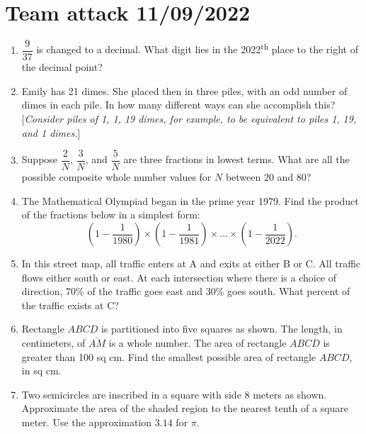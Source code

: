 \documentclass[11pt]{article}
\begin{document}
  \pagestyle{empty}
  \section*{Team attack 11/09/2022}
  \begin{enumerate}[leftmargin=3mm]
    \item $\dfrac{9}{37}$ is changed to a decimal. What digit lies in the 2022\textsuperscript{th} place to the right of the decimal point? %
    \item Emily has 21 dimes. She placed then in three piles, with an odd number of dimes in each pile. In how many different ways can she accomplish this? [\emph{Consider piles of 1, 1, 19 dimes, for example, to be equivalent to piles 1, 19, and 1 dimes.}] %
    \item Suppose $\dfrac{2}{N}$, $\dfrac{3}{N}$, and $\dfrac{5}{N}$ are three fractions in lowest terms. What are all the possible composite whole number values for $N$ between $20$ and $80$? %
    \item The Mathematical Olympiad began in the prime year 1979. Find the product of the fractions below in a simplest form:
    \[ 
      \left(1 - \frac{1}{1980}\right) \times \left(1 - \frac{1}{1981}\right) \times \ldots \times \left(1 - \frac{1}{2022}\right). 
    \] %
    \item In this street map, all traffic enters at A and exits at either B or C. All traffic flows either south or east. At each intersection where there is a choice of direction, 70\% of the traffic goes east and 30\% goes south. What percent of the traffic exists at C? %
    \item Rectangle $ABCD$ is partitioned into five squares as shown. The length, in centimeters, of $\overline{AM}$ is a whole number. The area of rectangle $ABCD$ is greater than 100 sq cm. Find the smallest possible area of rectangle $ABCD$, in sq cm. %
    \item Two semicircles are inscribed in a square with side $8$ meters as shown. Approximate the area of the shaded region to the nearest tenth of a square meter. Use the approximation $3.14$ for $\pi$. %
  \end{enumerate}
\end{document}

